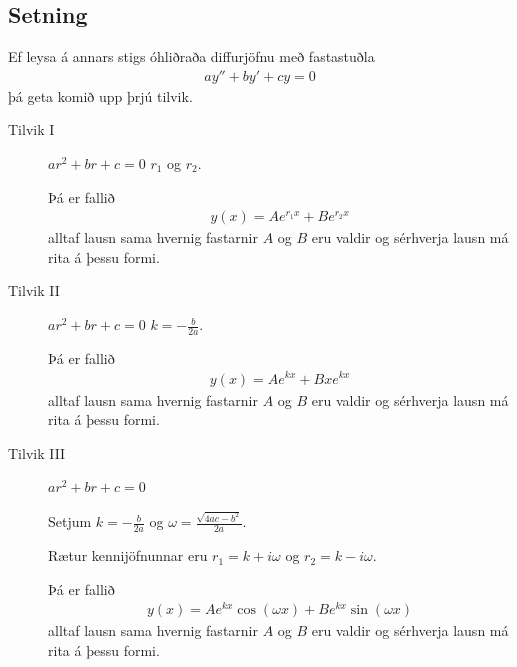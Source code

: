 \documentclass[b5paper,10pt,icelandic]{sphinxmanual}
\begin{document}
\subsection{Setning}
\label{\detokenize{kafli08:stigs-ohlidrud}}\label{\detokenize{kafli08:id3}}
Ef leysa á annars stigs óhliðraða diffurjöfnu með fastastuðla
\begin{equation*}
\begin{split}ay''+by'+cy=0\end{split}
\end{equation*}
þá geta komið upp þrjú tilvik.
\begin{description}
\item[{Tilvik I}] \leavevmode
{} \(ar^2+br+c=0\) 
\(r_1\) og \(r_2\).

Þá er fallið
\begin{equation*}
\begin{split}y(x)=Ae^{r_1x}+Be^{r_2x}\end{split}
\end{equation*}
alltaf lausn sama hvernig fastarnir \(A\) og \(B\) eru
valdir og sérhverja lausn má rita á þessu formi.

\item[{Tilvik II}] \leavevmode
{} \(ar^2+br+c=0\) 
\(k=-\frac{b}{2a}\).

Þá er fallið
\begin{equation*}
\begin{split}y(x)=Ae^{kx}+Bxe^{kx}\end{split}
\end{equation*}
alltaf lausn sama hvernig fastarnir \(A\) og \(B\) eru
valdir og sérhverja lausn má rita á þessu formi.

\item[{Tilvik III}] \leavevmode
{} \(ar^2+br+c=0\) 

Setjum \(k=-\frac{b}{2a}\) og
\(\omega=\frac{\sqrt{4ac-b^2}}{2a}\).

Rætur kennijöfnunnar eru \(r_1=k+i\omega\) og
\(r_2=k-i\omega\).

Þá er fallið
\begin{equation*}
\begin{split}y(x)=Ae^{kx}\cos(\omega x)+Be^{kx}\sin(\omega x)\end{split}
\end{equation*}
alltaf lausn sama hvernig fastarnir \(A\) og \(B\) eru
valdir og sérhverja lausn má rita á þessu formi.

\end{description}
\end{document}
